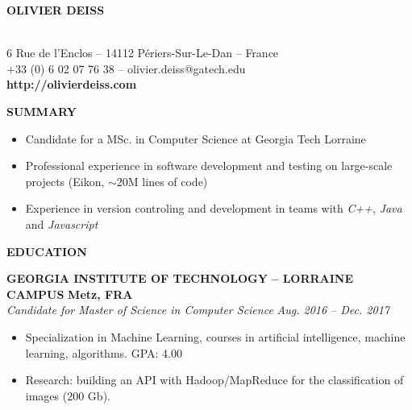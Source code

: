 \documentclass[a4paper, 12pt]{article}
\newcommand{\marginline}{-0.3cm}
\newcommand{\margincontent}{-0.6cm}
\newcommand{\marginsummary}{-0.3cm}
\newcommand{\marginaftersummary}{0.2cm}
\newcommand{\linewidthperso}{0.02cm}
\begin{document}
\begin{footnotesize}

\begin{center}
  \begin{small}\textbf{OLIVIER DEISS}\end{small}\\
  6 Rue de l'Enclos -- 14112 P\'eriers-Sur-Le-Dan -- France\\
  +33 (0) 6 02 07 76 38 -- olivier.deiss@gatech.edu\\
  \textbf{http://olivierdeiss.com}
\end{center}

\textbf{SUMMARY}
\vspace{\marginline}\\
\noindent\makebox[\linewidth]{\rule{\textwidth}{\linewidthperso}}

\vspace{\marginsummary}
\begin{itemize}
  \item Candidate for a MSc. in Computer Science at Georgia Tech Lorraine
  \item Professional experience in software development and testing on large-scale projects (Eikon, $\sim$20M lines of code)
  \item Experience in version controling and development in teams with \textit{C++}, \textit{Java} and \textit{Javascript}
\end{itemize}
\vspace{\marginaftersummary}

\textbf{EDUCATION}
\vspace{\marginline}\\
\noindent\makebox[\linewidth]{\rule{\textwidth}{\linewidthperso}}

\textbf{GEORGIA INSTITUTE OF TECHNOLOGY -- LORRAINE CAMPUS} \hfill \textbf{Metz, FRA}\\
\textit{Candidate for Master of Science in Computer Science} \hfill \textit{Aug. 2016 -- Dec. 2017}\\
\vspace{\margincontent}
\begin{itemize}
  \item Specialization in Machine Learning, courses in artificial intelligence, machine learning, algorithms. \hfill GPA: 4.00
  \item Research: building an API with Hadoop/MapReduce for the classification of images (200 Gb).
\end{itemize}


\end{footnotesize}
\end{document}
